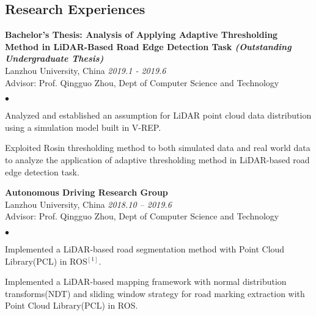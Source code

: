 \documentclass[margin,line,pifont,palatino,courier]{res}
\newenvironment{list1}{
	\begin{list}{\ding{113}}{%
			\setlength{\itemsep}{0in}
			\setlength{\parsep}{0in} \setlength{\parskip}{0in}
			\setlength{\topsep}{0in} \setlength{\partopsep}{0in}
			\setlength{\leftmargin}{0.17in}}}{\end{list}}
\newenvironment{list2}{
	\begin{list}{$\bullet$}{%
			\setlength{\itemsep}{0in}
			\setlength{\parsep}{0in} \setlength{\parskip}{0in}
			\setlength{\topsep}{0in} \setlength{\partopsep}{0in}
			\setlength{\leftmargin}{0.2in}}}{\end{list}}
\begin{document}
\begin{resume}
%		
			
		\section{\sc Research Experiences}
		
		{\bf Bachelor's Thesis: Analysis of Applying Adaptive Thresholding Method in LiDAR-Based Road Edge Detection Task \it (Outstanding Undergraduate Thesis)}\\
		Lanzhou University, China \hfill {\sl 2019.1 - 2019.6} \\
		Advisor: Prof. Qingguo Zhou, Dept of Computer Science and Technology
		\begin{list2}
			\item Analyzed and established an assumption for LiDAR point cloud data distribution using a simulation model built in V-REP.
			\item Exploited Rosin thresholding method to both simulated data and real world data to analyze the application of adaptive thresholding method in LiDAR-based road edge detection task.
		\end{list2}
		
		{\bf Autonomous Driving Research Group} \\
		Lanzhou University, China \hfill {\sl 2018.10 -- 2019.6} \\
		Advisor: Prof. Qingguo Zhou, Dept of Computer Science and Technology
		\begin{list2}
			\item Implemented a LiDAR-based road segmentation method with Point Cloud Library(PCL) in ROS$^{[1]}$.
			\item Implemented a LiDAR-based mapping framework with normal distribution transforms(NDT) and sliding window strategy for road marking extraction with Point Cloud Library(PCL) in ROS.
		\end{list2}
	

\end{resume}
\end{document}
